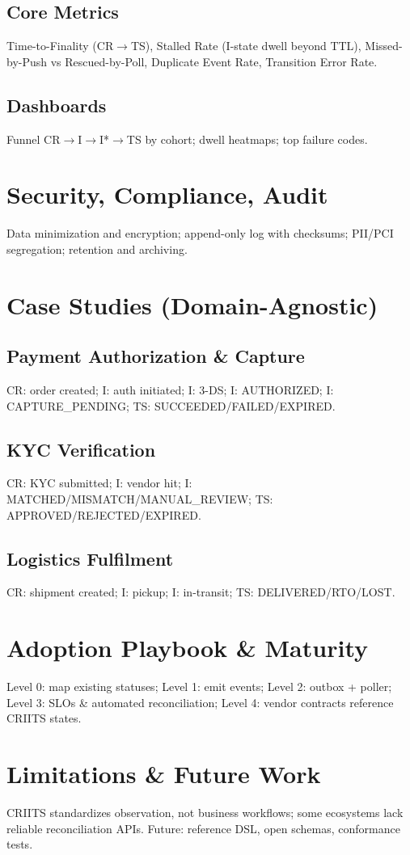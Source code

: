 \documentclass[11pt]{article}
\begin{document}
\subsection{Core Metrics}
Time-to-Finality (CR$\to$TS), Stalled Rate (I-state dwell beyond TTL), Missed-by-Push vs Rescued-by-Poll, Duplicate Event Rate, Transition Error Rate.
\subsection{Dashboards}
Funnel CR$\to$I$\to$I*$\to$TS by cohort; dwell heatmaps; top failure codes.

\section{Security, Compliance, Audit}
Data minimization and encryption; append-only log with checksums; PII/PCI segregation; retention and archiving.

\section{Case Studies (Domain-Agnostic)}
\subsection{Payment Authorization \& Capture}
CR: order created; I: auth initiated; I: 3-DS; I: AUTHORIZED; I: CAPTURE\_PENDING; TS: SUCCEEDED/FAILED/EXPIRED.
\subsection{KYC Verification}
CR: KYC submitted; I: vendor hit; I: MATCHED/MISMATCH/MANUAL\_REVIEW; TS: APPROVED/REJECTED/EXPIRED.
\subsection{Logistics Fulfilment}
CR: shipment created; I: pickup; I: in-transit; TS: DELIVERED/RTO/LOST.

\section{Adoption Playbook \& Maturity}
Level 0: map existing statuses; Level 1: emit events; Level 2: outbox + poller; Level 3: SLOs \& automated reconciliation; Level 4: vendor contracts reference CRIITS states.

\section{Limitations \& Future Work}
CRIITS standardizes observation, not business workflows; some ecosystems lack reliable reconciliation APIs. Future: reference DSL, open schemas, conformance tests.
\end{document}
